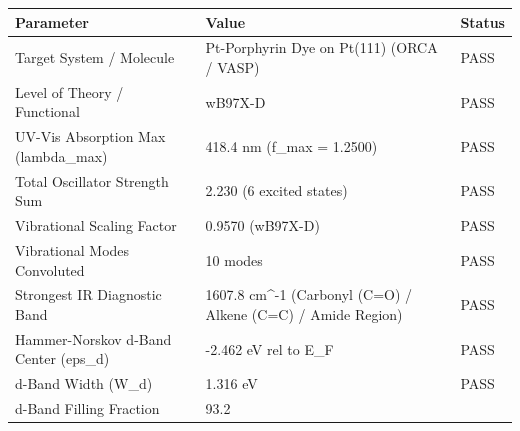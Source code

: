 \begin{tabular}{lll}
\toprule
Parameter & Value & Status \\
\midrule
Target System / Molecule & Pt-Porphyrin Dye on Pt(111) (ORCA / VASP) & PASS \\
Level of Theory / Functional & wB97X-D & PASS \\
UV-Vis Absorption Max (lambda_max) & 418.4 nm (f_max = 1.2500) & PASS \\
Total Oscillator Strength Sum & 2.230 (6 excited states) & PASS \\
Vibrational Scaling Factor & 0.9570 (wB97X-D) & PASS \\
Vibrational Modes Convoluted & 10 modes & PASS \\
Strongest IR Diagnostic Band & 1607.8 cm^-1 (Carbonyl (C=O) / Alkene (C=C) / Amide Region) & PASS \\
Hammer-Norskov d-Band Center (eps_d) & -2.462 eV rel to E_F & PASS \\
d-Band Width (W_d) & 1.316 eV & PASS \\
d-Band Filling Fraction & 93.2%
\bottomrule
\end{tabular}
